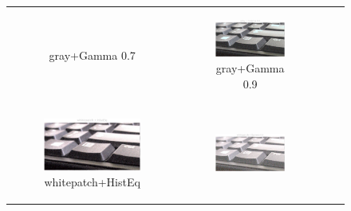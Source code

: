 \documentclass[11pt, a4]{article}
\begin{document}
\begin{enumerate}
\begin{figure}[H]
{\begin{tabular}{cccc}
\begin{subfigure}[h]{0.45\linewidth}
							\caption{gray+Gamma 0.7}
							\label{fig:RawImage2_tone_3}
						\end{subfigure} &
						\begin{subfigure}[h]{0.45\linewidth}
							\centering
							\includegraphics[width=\linewidth]{../output/RawImage2_Tone_gray_Gamma0.9.pdf}
							\caption{gray+Gamma 0.9}
							\label{fig:RawImage2_tone_4}
						\end{subfigure}\\
						\begin{subfigure}[h]{0.45\linewidth}
							\centering
							\includegraphics[width=\linewidth]{../output/RawImage2_Tone_whitepatch_HistEq.pdf}
							\caption{whitepatch+HistEq}
							\label{fig:RawImage2_tone_5}
						\end{subfigure} &
						\begin{subfigure}[h]{0.45\linewidth}
							\centering
							\includegraphics[width=\linewidth]{../output/RawImage2_Tone_whitepatch_Gamma0.5.pdf}

\end{subfigure}
\end{tabular}}
\end{figure}
\end{enumerate}
\end{document}
